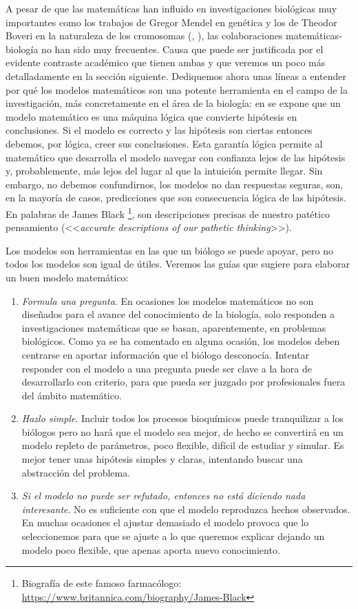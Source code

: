 A pesar de que las matemáticas han influido en investigaciones biológicas muy importantes como los trabajos de Gregor Mendel en genética y los de Theodor Boveri en la naturaleza de los cromosomas (\cite{mathsModInmu}, \cite{esteban2003mendel}), las colaboraciones matemáticas-biología no han sido muy frecuentes. Causa que puede ser justificada por el evidente contraste académico que tienen ambas y que veremos un poco más detalladamente en la sección siguiente. Dediquemos ahora unas líneas a entender por qué los modelos matemáticos son una potente herramienta en el campo de la investigación, más concretamente en el área de la biología: en \cite{Gunawardena2014} se expone que un modelo matemático es una máquina lógica que convierte hipótesis en conclusiones. Si el modelo es correcto y las hipótesis son ciertas entonces debemos, por lógica, creer sus conclusiones. Esta garantía lógica permite al matemático que desarrolla el modelo navegar con confianza lejos de las hipótesis y, probablemente, más lejos del lugar al que la intuición permite llegar. Sin embargo, no debemos confundirnos, los modelos no dan respuestas seguras, son, en la mayoría de casos, predicciones que son consecuencia lógica de las hipótesis. En palabras de James Black \footnote{Biografía de este famoso farmacólogo: \url{https://www.britannica.com/biography/James-Black}}, son descripciones precisas de nuestro patético pensamiento (<<\textit{accurate descriptions of our pathetic thinking}>>).

Los modelos son herramientas en las que un biólogo se puede apoyar, pero no todos los modelos son igual de útiles. Veremos las guías que sugiere \cite{Gunawardena2014} para elaborar un buen modelo matemático:

\begin{enumerate}
	\item \textit{Formula una pregunta}. En ocasiones los modelos matemáticos no son diseñados para el avance del conocimiento de la biología, solo responden a investigaciones matemáticas que se basan, aparentemente, en problemas biológicos. Como ya se ha comentado en alguna ocasión, los modelos deben centrarse en aportar información que el biólogo desconocía. Intentar responder con el modelo a una pregunta puede ser clave a la hora de desarrollarlo con criterio, para que pueda ser juzgado por profesionales fuera del ámbito matemático. 
	
	\item \textit{Hazlo simple}. Incluir todos los procesos bioquímicos puede tranquilizar a los biólogos pero no hará que el modelo sea mejor, de hecho se convertirá en un modelo repleto de parámetros, poco flexible, difícil de estudiar y simular. Es mejor tener unas hipótesis simples y claras, intentando buscar una abstracción del problema.
	
	\item \textit{Si el modelo no puede ser refutado, entonces no está diciendo nada interesante}. No es suficiente con que el modelo reproduzca hechos observados. En muchas ocasiones el ajustar demasiado el modelo provoca que lo seleccionemos para que se ajuste a lo que queremos explicar dejando un modelo poco flexible, que apenas aporta nuevo conocimiento.
\end{enumerate}

